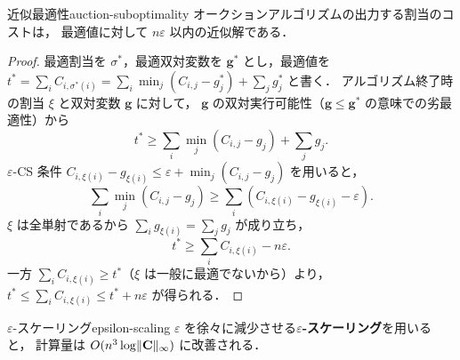 \begin{proposition}{近似最適性}{auction-suboptimality}
  オークションアルゴリズムの出力する割当のコストは，
  最適値に対して $n\varepsilon$ 以内の近似解である．
\end{proposition}

\begin{proof}
  最適割当を $\sigma^*$，最適双対変数を $\mathbf{g}^*$ とし，最適値を
  $t^* = \sum_i C_{i,\sigma^*(i)} = \sum_i \min_j (C_{i,j} - g^*_j) + \sum_j g^*_j$
  と書く．
  アルゴリズム終了時の割当 $\xi$ と双対変数 $\mathbf{g}$ に対して，
  $\mathbf{g}$ の双対実行可能性（$\mathbf{g} \leq \mathbf{g}^*$ の意味での劣最適性）から
  \[
    t^* \geq \sum_i \min_j (C_{i,j} - g_j) + \sum_j g_j.
  \]
  $\varepsilon$-CS 条件 $C_{i,\xi(i)} - g_{\xi(i)} \leq \varepsilon + \min_j (C_{i,j} - g_j)$ を用いると，
  \[
    \sum_i \min_j (C_{i,j} - g_j)
    \geq \sum_i \left( C_{i,\xi(i)} - g_{\xi(i)} - \varepsilon \right).
  \]
  $\xi$ は全単射であるから $\sum_i g_{\xi(i)} = \sum_j g_j$ が成り立ち，
  \[
    t^* \geq \sum_i C_{i,\xi(i)} - n\varepsilon.
  \]
  一方 $\sum_i C_{i,\xi(i)} \geq t^*$（$\xi$ は一般に最適でないから）より，
  $t^* \leq \sum_i C_{i,\xi(i)} \leq t^* + n\varepsilon$ が得られる．
\end{proof}

\begin{remark}{$\varepsilon$-スケーリング}{epsilon-scaling}
  $\varepsilon$ を徐々に減少させる\textbf{$\varepsilon$-スケーリング}を用いると，
  計算量は $O(n^3 \log \lVert \mathbf{C} \rVert_\infty)$ に改善される．
\end{remark}

